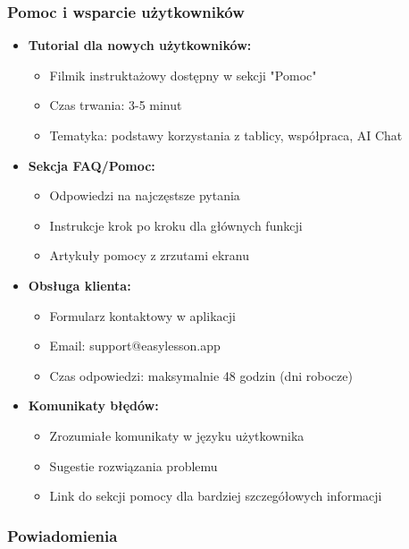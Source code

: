 \documentclass[12pt,a4paper]{article}
\begin{document}
\subsubsection{Pomoc i wsparcie użytkowników}

\begin{itemize}[leftmargin=*]
    \item \textbf{Tutorial dla nowych użytkowników:}
    \begin{itemize}
        \item Filmik instruktażowy dostępny w sekcji "Pomoc"
        \item Czas trwania: 3-5 minut
        \item Tematyka: podstawy korzystania z tablicy, współpraca, AI Chat
    \end{itemize}
    \item \textbf{Sekcja FAQ/Pomoc:}
    \begin{itemize}
        \item Odpowiedzi na najczęstsze pytania
        \item Instrukcje krok po kroku dla głównych funkcji
        \item Artykuły pomocy z zrzutami ekranu
    \end{itemize}
    \item \textbf{Obsługa klienta:}
    \begin{itemize}
        \item Formularz kontaktowy w aplikacji
        \item Email: support@easylesson.app
        \item Czas odpowiedzi: maksymalnie 48 godzin (dni robocze)
    \end{itemize}
    \item \textbf{Komunikaty błędów:}
    \begin{itemize}
        \item Zrozumiałe komunikaty w języku użytkownika
        \item Sugestie rozwiązania problemu
        \item Link do sekcji pomocy dla bardziej szczegółowych informacji
    \end{itemize}
\end{itemize}

\subsubsection{Powiadomienia}
\end{document}

